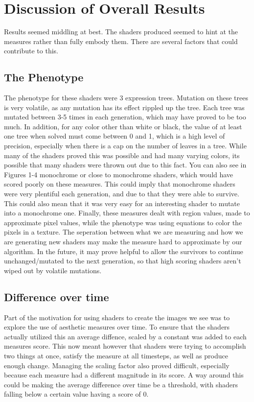 \documentclass{acmart}
\begin{document}
\section*{Discussion of Overall Results}
Results seemed middling at best. The shaders produced seemed to hint at the measures rather than fully embody them. There are several factors that could contribute to this.
\subsection*{The Phenotype}
The phenotype for these shaders were 3 expression trees. Mutation on these trees is very volatile, as any mutation has its effect rippled up the tree. Each tree was mutated between 3-5 times in each generation, which may have 
proved to be too much. In addition, for any color other than white or black, the value of at least one tree when solved must come between 0 and 1, which is a high level of precision, especially when there is a cap on 
the number of leaves in a tree. While many of the shaders proved this was possible and had many varying colors, its possible that many shaders were thrown out due to this fact. You can also see in Figures 1-4
monochrome or close to monochrome shaders, which would have scored poorly on these measures. This could imply that monochrome shaders were very plentiful each generation, and due to that they were able to survive. This could also mean 
that it was very easy for an interesting shader to mutate into a monochrome one. Finally, these measures dealt with region values, made to approximate pixel values, while the phenotype
was using equations to color the pixels in a texture. The seperation between what we are measuring and how we are generating new shaders may make the measure hard to approximate by our algorithm.
In the future, it may prove helpful to allow the survivors to continue unchanged/mutated to the next generation, so that high scoring shaders aren't wiped out by volatile mutations.

\subsection*{Difference over time}
Part of the motivation for using shaders to create the images we see was to explore the use of aesthetic measures over time. To ensure that the shaders actually utilized this
an average diffence, scaled by a constant was added to each measures score. This now meant however that shaders were trying to accomplish two things at once, satisfy the measure at all 
timesteps, as well as produce enough change. Managing the scaling factor also proved difficult, especially because each measure had a different magnitude in its score. A way around this could be
making the average difference over time be a threshold, with shaders falling below a certain value having a score of 0.
\end{document}
